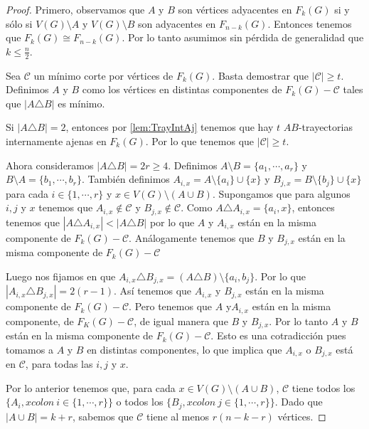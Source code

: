 \begin{proof}
Primero, observamos que $A$ y $B$ son v\'ertices adyacentes en $F_k(G)$ si y
s\'olo si $V(G) \setminus A$ y $V(G)\setminus B$ son adyacentes en $F_{n-k}(G)$.
Entonces tenemos que $F_k(G) \cong F_{n-k}(G)$. Por lo tanto asumimos sin
p\'erdida de generalidad que $k \leq \frac{n}{2}$.

Sea $\mathcal{C}$ un m\'inimo corte por v\'ertices de $F_k(G)$. Basta
demostrar que $|\mathcal{C}| \geq t$. Definimos $A$ y $B$ como los v\'ertices en
distintas componentes de $F_k(G)- \mathcal{C}$ tales que $|A \triangle B|$ es
m\'inimo.

Si $|A \triangle B| = 2$, entonces por \cref{lem:TrayIntAj}
tenemos que hay $t$ $AB$-trayectorias internamente ajenas en $F_k(G)$. Por lo
que tenemos que $|\mathcal{C}| \geq t$.

Ahora consideramos $|A \triangle B| = 2r \geq 4$. Definimos $A \setminus B
=\{a_1, \cdots, a_r\}$ y $B \setminus A =\{b_1, \cdots, b_r\}$. Tambi\'en
definimos $A_{i,x} = A\setminus \{a_i\} \cup \{x\}$ y $B_{j,x} = B\setminus
\{b_j\} \cup \{x\}$ para cada $i \in \{1, \cdots, r\}$ y $x \in V(G)\setminus
(A\cup B)$. Supongamos que para algunos $i, j$ y $x$ tenemos que $A_{i,x} \notin
\mathcal{C}$ y $B_{j,x} \notin \mathcal{C}$. Como $A \triangle A_{i,x} = \{a_i,
x\}$, entonces tenemos que $|A \triangle A_{i,x}|< |A \triangle B|$ por lo que
$A$ y $A_{i,x}$ est\'an en la misma componente de $F_k(G)- \mathcal{C}$.
An\'alogamente tenemos que  $B$ y $B_{j,x}$ est\'an en la misma componente de
$F_k(G)-\mathcal{C}$

Luego nos fijamos en que $A_{i,x} \triangle B_{j,x} = (A \triangle B) \setminus
\{a_i, b_j\}$. Por lo que $|A_{i,x} \triangle B_{j,x}| = 2(r-1)$. As\'i
tenemos que $A_{i,x}$ y $B_{j,x}$ est\'an en la misma componente de $F_k(G)-
\mathcal{C}$. Pero tenemos que $A$ y$A_{i,x}$ est\'an en la misma componente, de
$F_K(G) - \mathcal{C}$, de igual manera que $B$ y $B_{j,x}$. Por lo tanto $A$ y
$B$ est\'an en la misma componente de $F_k(G)- \mathcal{C}$. Esto es una
cotradicci\'on pues tomamos a $A$ y $B$ en distintas componentes, lo que implica
que $A_{i,x}$ o $B_{j,x}$ est\'a en $\mathcal{C}$, para todas las $i,j$ y $x$.

Por lo anterior tenemos que, para cada $x \in V(G)\setminus (A \cup B)$,
$\mathcal{C}$ tiene todos los $\{A_i,x colon\ i \in \{1, \cdots, r\}\}$ o todos los
$\{B_j,x colon\ j \in \{1, \cdots, r\}\}$. Dado que $|A\cup B|=k +r$, sabemos que
$\mathcal{C}$ tiene al menos $r(n-k-r)$ v\'ertices.


\end{proof}
